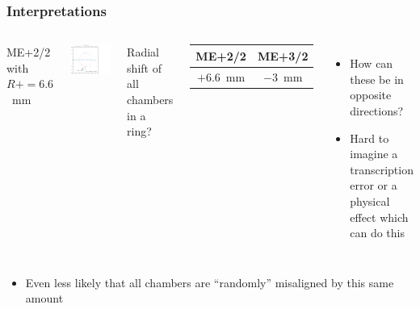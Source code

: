 \documentclass[compress]{beamer}
\begin{document}
\begin{frame}
\frametitle{Interpretations}
\small

\begin{columns}
ME+2/2 with $R += 6.6$~mm

\includegraphics[width=\linewidth]{CRUZET1_MEplus22_Yf6_6mm_plusIsRef_ch1fix_XphiZ.png}

Radial shift of all chambers in a ring?

\begin{center}
\renewcommand{\arraystretch}{1.2}
\begin{tabular}{c c}
ME+2/2 & ME+3/2 \\\hline
$+6.6$~mm & $-3$~mm
\end{tabular}
\end{center}

\begin{itemize}
\item How can these be in opposite directions?
\item Hard to imagine a transcription error or a physical effect which can do this
\end{itemize}
\end{columns}

\vfill
\begin{itemize}
\item Even less likely that all chambers are ``randomly'' misaligned by this same amount
\end{itemize}
\end{frame}
\end{document}
